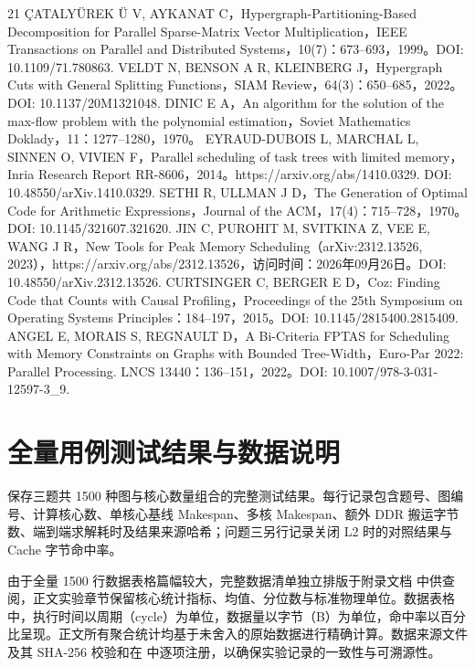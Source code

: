 \documentclass[anonymous,withtoc]{gmcm2026}
\begin{document}
\begin{thebibliography}{21}
 ÇATALYÜREK Ü V, AYKANAT C，Hypergraph-Partitioning-Based Decomposition for Parallel Sparse-Matrix Vector Multiplication，IEEE Transactions on Parallel and Distributed Systems，10(7)：673--693，1999。DOI: 10.1109/71.780863.
 VELDT N, BENSON A R, KLEINBERG J，Hypergraph Cuts with General Splitting Functions，SIAM Review，64(3)：650--685，2022。DOI: 10.1137/20M1321048.
 DINIC E A，An algorithm for the solution of the max-flow problem with the polynomial estimation，Soviet Mathematics Doklady，11：1277--1280，1970。
 EYRAUD-DUBOIS L, MARCHAL L, SINNEN O, VIVIEN F，Parallel scheduling of task trees with limited memory，Inria Research Report RR-8606，2014。https://arxiv.org/abs/1410.0329. DOI: 10.48550/arXiv.1410.0329.
 SETHI R, ULLMAN J D，The Generation of Optimal Code for Arithmetic Expressions，Journal of the ACM，17(4)：715--728，1970。DOI: 10.1145/321607.321620.
 JIN C, PUROHIT M, SVITKINA Z, VEE E, WANG J R，New Tools for Peak Memory Scheduling（arXiv:2312.13526, 2023），https://arxiv.org/abs/2312.13526，访问时间：2026年09月26日。DOI: 10.48550/arXiv.2312.13526.
 CURTSINGER C, BERGER E D，Coz: Finding Code that Counts with Causal Profiling，Proceedings of the 25th Symposium on Operating Systems Principles：184--197，2015。DOI: 10.1145/2815400.2815409.
 ANGEL E, MORAIS S, REGNAULT D，A Bi-Criteria FPTAS for Scheduling with Memory Constraints on Graphs with Bounded Tree-Width，Euro-Par 2022: Parallel Processing. LNCS 13440：136--151，2022。DOI: 10.1007/978-3-031-12597-3\_9.
\end{thebibliography}

\appendix
\section{全量用例测试结果与数据说明}

\texttt{} 保存三题共 1500 种图与核心数量组合的完整测试结果。每行记录包含题号、图编号、计算核心数、单核心基线 Makespan、多核 Makespan、额外 DDR 搬运字节数、端到端求解耗时及结果来源哈希；问题三另行记录关闭 L2 时的对照结果与 Cache 字节命中率。

由于全量 1500 行数据表格篇幅较大，完整数据清单独立排版于附录文档 \texttt{} 中供查阅，正文实验章节保留核心统计指标、均值、分位数与标准物理单位。数据表格中，执行时间以周期（cycle）为单位，数据量以字节（B）为单位，命中率以百分比呈现。正文所有聚合统计均基于未舍入的原始数据进行精确计算。数据来源文件及其 SHA-256 校验和在 \texttt{} 中逐项注册，以确保实验记录的一致性与可溯源性。
\end{document}
